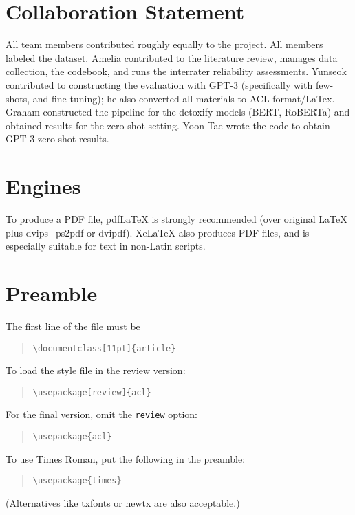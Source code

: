 \documentclass[11pt]{article}
\begin{document}
\section{Collaboration Statement}
All team members contributed roughly equally to the project. All members labeled the dataset. Amelia contributed to the literature review, manages data collection, the codebook, and runs the interrater reliability assessments. Yunseok contributed to constructing the evaluation with GPT-3 (specifically with few-shots, and fine-tuning); he also converted all materials to ACL format/LaTex. Graham constructed the pipeline for the detoxify models (BERT,  RoBERTa) and obtained results for the zero-shot setting. Yoon Tae wrote the code to obtain GPT-3 zero-shot results.
\section{Engines}

To produce a PDF file, pdf\LaTeX{} is strongly recommended (over original \LaTeX{} plus dvips+ps2pdf or dvipdf). Xe\LaTeX{} also produces PDF files, and is especially suitable for text in non-Latin scripts.

\section{Preamble}

The first line of the file must be
\begin{quote}
\begin{verbatim}
\documentclass[11pt]{article}
\end{verbatim}
\end{quote}

To load the style file in the review version:
\begin{quote}
\begin{verbatim}
\usepackage[review]{acl}
\end{verbatim}
\end{quote}
For the final version, omit the \verb|review| option:
\begin{quote}
\begin{verbatim}
\usepackage{acl}
\end{verbatim}
\end{quote}

To use Times Roman, put the following in the preamble:
\begin{quote}
\begin{verbatim}
\usepackage{times}
\end{verbatim}
\end{quote}
(Alternatives like txfonts or newtx are also acceptable.)
\end{document}
